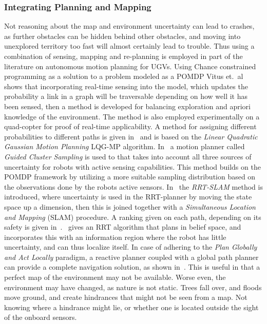 \subsubsection{Integrating Planning and Mapping}
Not reasoning about the map and environment uncertainty can lead to crashes, as
further obstacles can be hidden behind other obstacles, and moving into
unexplored territory too fast will almost certainly lead to trouble. Thus using
a combination of sensing, mapping and re-planning is employed in part of the
literature on autonomous motion planning for UGVs. Using Chance constrained
programming as a solution to a problem modeled as a POMDP Vitus et.\
al~\cite{vitusHierarchicalMethodStochastic2012} shows that incorporating
real-time sensing into the model, which updates the probability a link in a
graph will be traversable depending on how well it has been sensed, then a
method is developed for balancing exploration and apriori knowledge of the
environment. The method is also employed experimentally on a quad-copter for
proof of real-time applicability. A method for assigning different probabilities
to different paths is given in~\cite{vandenbergLQGMPOptimizedPath2011} and is
based on the \textit{Linear Quadratic Gaussian Motion Planning} LQG-MP
algorithm. In~\cite{kurniawatiGlobalMotionPlanning2012} a motion planner called
\textit{Guided Cluster Sampling} is used to that takes into account all three
sources of uncertainty for robots with active sensing capabilities. This method
builds on the POMDP framework by utilizing a more suitable sampling distribution
based on the observations done by the robots active sensors.
In~\cite{yifenghuangRRTSLAMMotionPlanning2008} the \textit{RRT-SLAM} method is
introduced, where uncertainty is used in the RRT-planner by moving the state
space up a dimension, then this is joined together with a \textit{Simultaneous
  Location and Mapping} (SLAM) procedure. A ranking given on each path,
depending on its safety is given
in~\cite{blakeEfficientComputationCollision2018}.~\cite{bryRapidlyexploringRandomBelief2011}
gives an RRT algorithm that plans in belief space, and incorporates this with an
information region where the robot has little uncertainty, and can thus localize
itself. In case of adhering to the \textit{Plan Globally and Act Locally}
paradigm, a reactive planner coupled with a global path planner can provide a
complete navigation solution, as shown
in~\cite{djekouneSensorBasedNavigation2009}. This is useful in that a perfect
map of the environment may not be available. Worse even, the environment may
have changed, as nature is not static. Trees fall over, and floods move ground,
and create hindrances that might not be seen from a map. Not knowing where a
hindrance might lie, or whether one is located outside the sight of the onboard
sensors.
